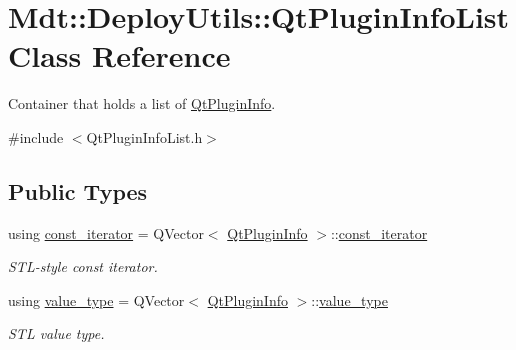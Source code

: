 \hypertarget{class_mdt_1_1_deploy_utils_1_1_qt_plugin_info_list}{}\section{Mdt\+:\+:Deploy\+Utils\+:\+:Qt\+Plugin\+Info\+List Class Reference}
\label{class_mdt_1_1_deploy_utils_1_1_qt_plugin_info_list}


Container that holds a list of \hyperlink{class_mdt_1_1_deploy_utils_1_1_qt_plugin_info}{Qt\+Plugin\+Info}.  




{\ttfamily \#include $<$Qt\+Plugin\+Info\+List.\+h$>$}

\subsection*{Public Types}
\begin{DoxyCompactItemize}
\item 
using \hyperlink{class_mdt_1_1_deploy_utils_1_1_qt_plugin_info_list_a53264e1e1de681739e375aea573ce2cf}{const\+\_\+iterator} = Q\+Vector$<$ \hyperlink{class_mdt_1_1_deploy_utils_1_1_qt_plugin_info}{Qt\+Plugin\+Info} $>$\+::\hyperlink{class_mdt_1_1_deploy_utils_1_1_qt_plugin_info_list_a53264e1e1de681739e375aea573ce2cf}{const\+\_\+iterator}\hypertarget{class_mdt_1_1_deploy_utils_1_1_qt_plugin_info_list_a53264e1e1de681739e375aea573ce2cf}{}\label{class_mdt_1_1_deploy_utils_1_1_qt_plugin_info_list_a53264e1e1de681739e375aea573ce2cf}

\begin{DoxyCompactList}\small\item\em S\+T\+L-\/style const iterator. \end{DoxyCompactList}\item 
using \hyperlink{class_mdt_1_1_deploy_utils_1_1_qt_plugin_info_list_a14c23dbea399f7871e62fd37259dbb55}{value\+\_\+type} = Q\+Vector$<$ \hyperlink{class_mdt_1_1_deploy_utils_1_1_qt_plugin_info}{Qt\+Plugin\+Info} $>$\+::\hyperlink{class_mdt_1_1_deploy_utils_1_1_qt_plugin_info_list_a14c23dbea399f7871e62fd37259dbb55}{value\+\_\+type}\hypertarget{class_mdt_1_1_deploy_utils_1_1_qt_plugin_info_list_a14c23dbea399f7871e62fd37259dbb55}{}\label{class_mdt_1_1_deploy_utils_1_1_qt_plugin_info_list_a14c23dbea399f7871e62fd37259dbb55}

\begin{DoxyCompactList}\small\item\em S\+TL value type. \end{DoxyCompactList}\end{DoxyCompactItemize}
